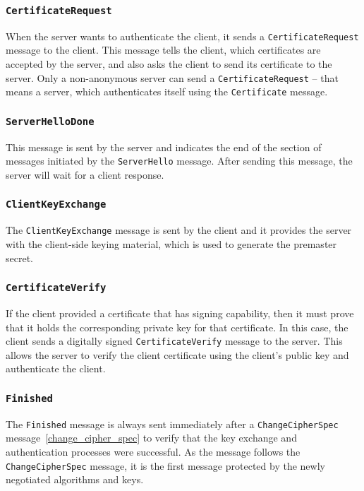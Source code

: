 \subsubsection{\texttt{CertificateRequest}}
    When the server wants to authenticate the client, it sends
    a \texttt{CertificateRequest} message to the client. This message tells
    the client, which certificates are accepted by the server, and also asks
    the client to send its certificate to the server. Only a non-anonymous
    server can send a \texttt{CertificateRequest} -- that means a server, which
    authenticates itself using the \texttt{Certificate} message.

\subsubsection{\texttt{ServerHelloDone}}
    This message is sent by the server and indicates the end of the section
    of messages initiated by the \texttt{ServerHello} message. After sending
    this message, the server will wait for a client response.

\subsubsection{\texttt{ClientKeyExchange}}
    The \texttt{ClientKeyExchange} message is sent by the client and it provides
    the server with the client-side keying material, which is used to generate
    the premaster secret.

\subsubsection{\texttt{CertificateVerify}}
    If the client provided a certificate that has signing capability, then it
    must prove that it holds the corresponding private key for that certificate.
    In this case, the client sends a digitally signed \texttt{CertificateVerify}
    message to the server. This allows the server to verify the client certificate
    using the client's public key and authenticate the client.

\subsubsection{\texttt{Finished}}
    The \texttt{Finished} message is always sent immediately after a
    \texttt{ChangeCipherSpec} message~\ref{change_cipher_spec} to verify
    that the key exchange and authentication processes were successful.
    As the message follows the \texttt{ChangeCipherSpec} message, it is the
    first message protected by the newly negotiated algorithms and keys.


